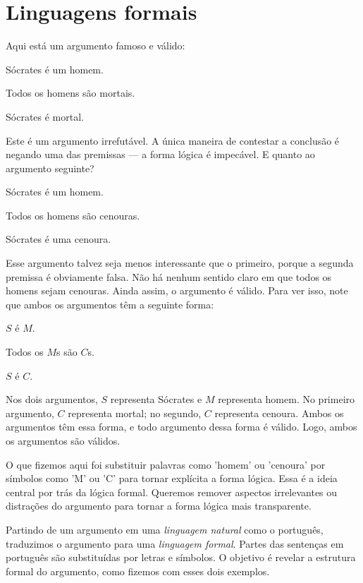 \section{Linguagens formais}

Aqui está um argumento famoso e válido:
\begin{earg}
\item[] Sócrates é um homem.
\item[] Todos os homens são mortais.
\item[\therefore] Sócrates é mortal.
\end{earg}
Este é um argumento irrefutável. A única maneira de contestar a conclusão é negando uma das premissas — a forma lógica é impecável. E quanto ao argumento seguinte?

\begin{earg}
\item[] Sócrates é um homem.
\item[] Todos os homens são cenouras.
\item[\therefore] Sócrates é uma cenoura.
\end{earg}

Esse argumento talvez seja menos interessante que o primeiro, porque a segunda premissa é obviamente falsa. Não há nenhum sentido claro em que todos os homens sejam cenouras. Ainda assim, o argumento é válido. Para ver isso, note que ambos os argumentos têm a seguinte forma:

\begin{earg}
\item[] $S$ é $M$.
\item[] Todos os $M$s são $C$s.
\item[\therefore] $S$ é $C$.
\end{earg}

Nos dois argumentos, $S$ representa Sócrates e $M$ representa homem. No primeiro argumento, $C$ representa mortal; no segundo, $C$ representa cenoura. Ambos os argumentos têm essa forma, e todo argumento dessa forma é válido. Logo, ambos os argumentos são válidos.

O que fizemos aqui foi substituir palavras como 'homem' ou 'cenoura' por símbolos como 'M' ou 'C' para tornar explícita a forma lógica. Essa é a ideia central por trás da lógica formal. Queremos remover aspectos irrelevantes ou distrações do argumento para tornar a forma lógica mais transparente.

Partindo de um argumento em uma \emph{linguagem natural} como o português, traduzimos o argumento para uma \emph{linguagem formal}. Partes das sentenças em português são substituídas por letras e símbolos. O objetivo é revelar a estrutura formal do argumento, como fizemos com esses dois exemplos.

